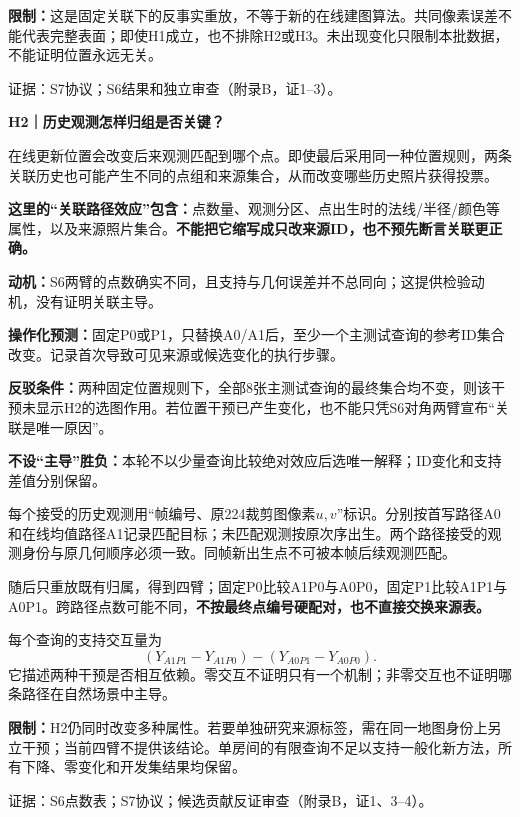 \documentclass[11pt,a4paper,fontset=none]{ctexart}
\newcommand{\smallhead}[1]{\vspace{4pt}{\large\bfseries\color{hypothesis1}#1}\par}
\newcommand{\docref}[1]{{\small\color{darkgray}证据：#1。}}
\begin{document}
\textbf{限制：}这是固定关联下的反事实重放，不等于新的在线建图算法。共同像素误差不能代表完整表面；即使H1成立，也不排除H2或H3。未出现变化只限制本批数据，不能证明位置永远无关。\par
\docref{S7协议；S6结果和独立审查（附录B，证1--3）}

\newpage
{\LARGE\bfseries\color{hypothesis2}H2｜历史观测怎样归组是否关键？}\par
\begin{hypothesisbox2}[解释与成立前提]
在线更新位置会改变后来观测匹配到哪个点。即使最后采用同一种位置规则，两条关联历史也可能产生不同的点组和来源集合，从而改变哪些历史照片获得投票。

\textbf{这里的“关联路径效应”包含：}点数量、观测分区、点出生时的法线/半径/颜色等属性，以及来源照片集合。\textbf{不能把它缩写成只改来源ID，也不预先断言关联更正确。}

\textbf{动机：}S6两臂的点数确实不同，且支持与几何误差并不总同向；这提供检验动机，没有证明关联主导。
\end{hypothesisbox2}

\begin{predictionbox}[预测与可反驳条件]
\textbf{操作化预测：}固定P0或P1，只替换A0/A1后，至少一个主测试查询的参考ID集合改变。记录首次导致可见来源或候选变化的执行步骤。

\textbf{反驳条件：}两种固定位置规则下，全部8张主测试查询的最终集合均不变，则该干预未显示H2的选图作用。若位置干预已产生变化，也不能只凭S6对角两臂宣布“关联是唯一原因”。

\textbf{不设“主导”胜负：}本轮不以少量查询比较绝对效应后选唯一解释；ID变化和支持差值分别保留。
\end{predictionbox}

\smallhead{设计：先记住每个观测的固定身份}
每个接受的历史观测用“帧编号、原224裁剪图像素$u,v$”标识。分别按首写路径A0和在线均值路径A1记录匹配目标；未匹配观测按原次序出生。两个路径接受的观测身份与原几何顺序必须一致。同帧新出生点不可被本帧后续观测匹配。

随后只重放既有归属，得到四臂；固定P0比较A1P0与A0P0，固定P1比较A1P1与A0P1。跨路径点数可能不同，\textbf{不按最终点编号硬配对，也不直接交换来源表。}

\begin{comparisonbox}
每个查询的支持交互量为
\[
  (Y_{A1P1}-Y_{A1P0})-(Y_{A0P1}-Y_{A0P0}).
\]
它描述两种干预是否相互依赖。零交互不证明只有一个机制；非零交互也不证明哪条路径在自然场景中主导。
\end{comparisonbox}

\textbf{限制：}H2仍同时改变多种属性。若要单独研究来源标签，需在同一地图身份上另立干预；当前四臂不提供该结论。单房间的有限查询不足以支持一般化新方法，所有下降、零变化和开发集结果均保留。\par
\docref{S6点数表；S7协议；候选贡献反证审查（附录B，证1、3--4）}
\end{document}
